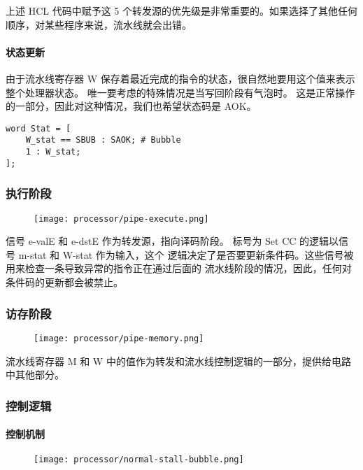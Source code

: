 上述 HCL 代码中赋予这 5 个转发源的优先级是非常重要的。如果选择了其他任何顺序，对某些程序来说，流水线就会出错。

\paragraph{状态更新}
由于流水线寄存器 W 保存着最近完成的指令的状态，很自然地要用这个值来表示整个处理器状态。
唯一要考虑的特殊情况是当写回阶段有气泡时。
这是正常操作的一部分，因此对这种情况，我们也希望状态码是 AOK。
\begin{lstlisting}[style=CStyle]
word Stat = [
    W_stat == SBUB : SAOK; # Bubble
    1 : W_stat;
];
\end{lstlisting}

\subsubsection{执行阶段}
\begin{figure}[H]
    \centering
    \texttt{[image: processor/pipe-execute.png]}
\end{figure}

信号 e-valE 和 e-dstE 作为转发源，指向译码阶段。
标号为 Set CC 的逻辑以信号 m-stat 和 W-stat 作为输入，这个
逻辑决定了是否要更新条件码。这些信号被用来检查一条导致异常的指令正在通过后面的
流水线阶段的情况，因此，任何对条件码的更新都会被禁止。

\subsubsection{访存阶段}
\begin{figure}[H]
    \centering
    \texttt{[image: processor/pipe-memory.png]}
\end{figure}

流水线寄存器 M 和 W 中的值作为转发和流水线控制逻辑的一部分，提供给电路中其他部分。

\subsubsection{控制逻辑}
\paragraph{控制机制}
\begin{figure}[H]
    \centering
    \texttt{[image: processor/normal-stall-bubble.png]}
\end{figure}

